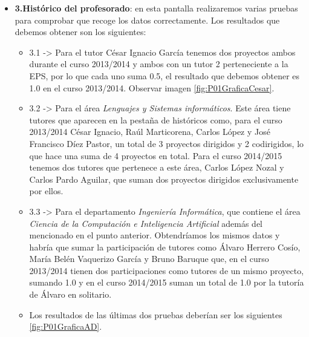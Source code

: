 \begin{itemize}
	\item \textbf{3.Histórico del profesorado}: en esta pantalla realizaremos varias pruebas para comprobar que recoge los datos correctamente. Los resultados que debemos obtener son los siguientes:
		\begin{itemize}
			\item 3.1 -> Para el tutor César Ignacio García tenemos dos proyectos ambos durante el curso 2013/2014 y ambos con un tutor 2 perteneciente a la EPS, por lo que cada uno suma 0.5, el resultado que debemos obtener es 1.0 en el curso 2013/2014. Observar imagen \ref{fig:P01GraficaCesar}.
			\item 3.2 -> Para el área \emph{Lenguajes y Sistemas informáticos}. Este área tiene tutores que aparecen en la pestaña de históricos como, para el curso 2013/2014 César Ignacio, Raúl Marticorena, Carlos López y José Francisco Díez Pastor, un total de 3 proyectos dirigidos y 2 codirigidos, lo que hace una suma de 4 proyectos en total. Para el curso 2014/2015 tenemos dos tutores que pertenece a este área, Carlos López Nozal y Carlos Pardo Aguilar, que suman dos proyectos dirigidos exclusivamente por ellos. 
			
			\item 3.3 -> Para el departamento \emph{Ingeniería Informática}, que contiene el área \emph{Ciencia de la Computación e Inteligencia Artificial} además del mencionado en el punto anterior. Obtendríamos los mismos datos y habría que sumar la participación de tutores como Álvaro Herrero Cosío, María Belén Vaquerizo García y Bruno Baruque que, en el curso 2013/2014 tienen dos participaciones como tutores de un mismo proyecto, sumando 1.0 y en el curso 2014/2015 suman un total de 1.0 por la tutoría de Álvaro en solitario.
			
			\item Los resultados de las últimas dos pruebas deberían ser los siguientes \ref{fig:P01GraficaAD}.
		\end{itemize}


\end{itemize}
